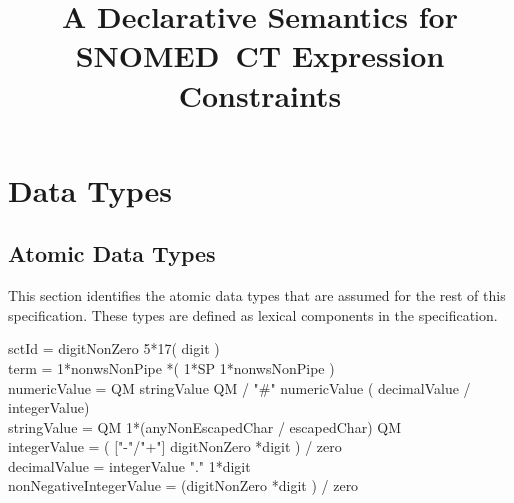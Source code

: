 \documentclass{article}
\title{A Declarative Semantics for SNOMED~CT Expression Constraints}
\def\bnf#1{{\scriptsize {{#1}} }}
\begin{document}
\maketitle
\tableofcontents
\pagebreak
\section{Data Types}
\subsection{Atomic Data Types}
This section identifies the atomic data types that are assumed for the rest of this specification.  These types
are defined as lexical components in the specification.
\begin{framed}
\noindent
\bnf{sctId = digitNonZero 5*17( digit )} \\
\bnf{term = 1*nonwsNonPipe *( 1*SP 1*nonwsNonPipe )} \\
\bnf{numericValue =  QM stringValue QM / "\#" numericValue ( decimalValue / integerValue)} \\
\bnf{stringValue =  QM 1*(anyNonEscapedChar / escapedChar) QM} \\
\bnf{integerValue = ( ["-"/"+"] digitNonZero *digit ) / zero} \\
\bnf{decimalValue = integerValue "." 1*digit} \\
\bnf{nonNegativeIntegerValue = (digitNonZero *digit ) / zero}
\end{framed}
\end{document}

